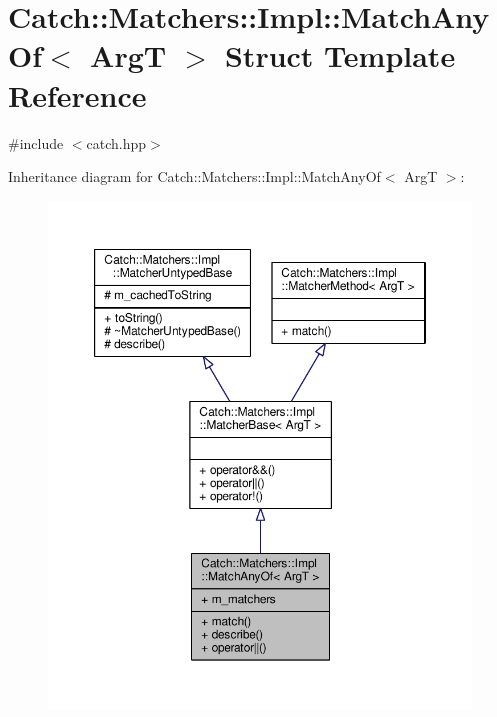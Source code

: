 \hypertarget{struct_catch_1_1_matchers_1_1_impl_1_1_match_any_of}{\section{Catch\-:\-:Matchers\-:\-:Impl\-:\-:Match\-Any\-Of$<$ Arg\-T $>$ Struct Template Reference}
\label{struct_catch_1_1_matchers_1_1_impl_1_1_match_any_of}
}


{\ttfamily \#include $<$catch.\-hpp$>$}



Inheritance diagram for Catch\-:\-:Matchers\-:\-:Impl\-:\-:Match\-Any\-Of$<$ Arg\-T $>$\-:
\nopagebreak
\begin{figure}[H]
\begin{center}
\leavevmode
\includegraphics[width=350pt]{struct_catch_1_1_matchers_1_1_impl_1_1_match_any_of__inherit__graph}
\end{center}
\end{figure}


